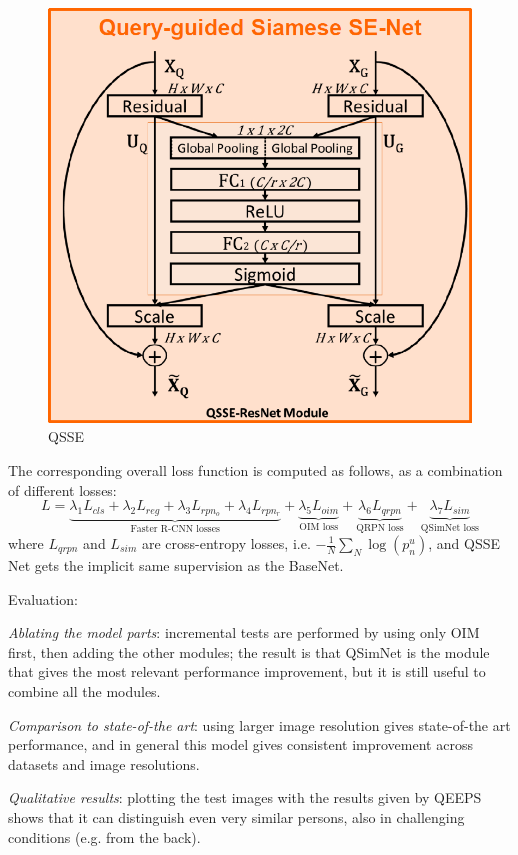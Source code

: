 \begin{minipage}{.26\textwidth}
    \begin{figure}[H]
        \centering
        \includegraphics[width=.95\linewidth]{images/qsse}
        \caption[QSSE]{QSSE}
        \label{fig:qsse}
    \end{figure}
\end{minipage}

The corresponding overall loss function is computed as follows, as a combination of different losses:
\begin{equation}\label{eq:qeeps-loss}
    L = \underbrace{ \lambda_1 L_{cls} + \lambda_2 L_{reg} + \lambda_3 L_{rpn_o} + \lambda_4 L_{rpn_r} }_{\text{Faster R-CNN losses}} + \underbrace{ \lambda_5 L_{oim} }_{\text{OIM loss}} + \underbrace{ \lambda_6 L_{qrpn} }_{\text{QRPN loss}} + \underbrace{ \lambda_7 L_{sim} }_{\text{QSimNet loss}}
\end{equation}
where $L_{qrpn}$ and $L_{sim}$ are cross-entropy losses, i.e. $- \frac1N \sum_N \log(p_n^u)$, and QSSE Net gets the implicit same supervision as the BaseNet.

Evaluation:
\begin{myitem}
    \item \textit{Ablating the model parts}: incremental tests are performed by using only OIM first, then adding the other modules; the result is that QSimNet is the module that gives the most relevant performance improvement, but it is still useful to combine all the modules.
    \item \textit{Comparison to state-of-the art}: using larger image resolution gives state-of-the art performance, and in general this model gives consistent improvement across datasets and image resolutions.
    \item \textit{Qualitative results}: plotting the test images with the results given by QEEPS shows that it can distinguish even very similar persons, also in challenging conditions (e.g. from the back).
\end{myitem}


